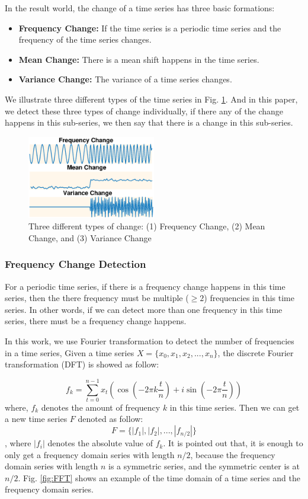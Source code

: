 In the result world, the change of a time series has three basic formations: 
\begin{itemize}
  \item \textbf{Frequency Change:} If the time series is a periodic time series and the frequency of the time series changes. 
  \item \textbf{Mean Change:} There is a mean shift happens in the time series.
  \item \textbf{Variance Change:} The variance of a time series changes.
\end{itemize}
We illustrate three different types of the time series in Fig. \ref{fig:ChangeType}.
And in this paper, we detect these three types of change individually, if there any of the change happens in this sub-series, we then say that there is a change in this sub-series.
\begin{figure}[t]
\centering
\includegraphics[width=0.5\textwidth]{ChangeType.eps}
\caption{Three different types of change: (1) Frequency Change, (2) Mean Change, and (3) Variance Change}
\label{fig:ChangeType}
\end{figure}

\subsubsection{Frequency Change Detection}

For a periodic time series, if there is a frequency change happens in this time series, then the there frequency must be multiple ($\geq 2 $) frequencies in this time series. In other words, if we can detect more than one frequency in this time series, there must be a frequency change happens.

In this work, we use Fourier transformation to detect the number of frequencies in a time series, Given a time series $X = \{x_0,x_1,x_2,...,x_n\}$, the discrete Fourier transformation (DFT) is showed as follow:

\begin{equation}
f_k = \sum_{t=0}^{n-1}x_t(\cos(-2\pi k\frac{t}{n})+i\sin(-2\pi \frac{t}{n}))
\end{equation}
where, $f_k$ denotes the amount of frequency $k$ in this time series. Then we can get a new time series $F$ denoted as follow:
\[ F = \{|f_1|,|f_2|,...,|f_{n/2}|\}\],
where $|f_i|$ denotes the absolute value of $f_k$. It is pointed out that, it is enough to only get a frequency domain series with length $n/2$, because the frequency domain series with length $n$ is a symmetric series, and the symmetric center is at $n/2$. Fig. \ref{fig:FFT} shows an example of the time domain of a time series and the frequency domain series.

